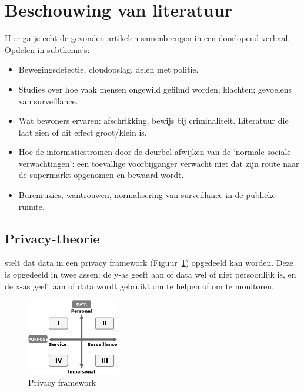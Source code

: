 \documentclass[nonacm, sigconf]{acmart}
\begin{document}
    \section{Beschouwing van literatuur}
    \begin{editorsonlyBox}
        Hier ga je echt de gevonden artikelen samenbrengen in een doorlopend verhaal.
        Opdelen in subthema's:

        \begin{itemize}
            \item Bewegingsdetectie, cloudopslag, delen met politie.
            \item Studies over hoe vaak mensen ongewild gefilmd worden; klachten; gevoelens van surveillance.
            \item Wat bewoners ervaren: afschrikking, bewijs bij criminaliteit. Literatuur die laat zien of dit effect groot/klein is.
            \item Hoe de informatiestromen door de deurbel afwijken van de ‘normale sociale verwachtingen': een toevallige voorbijganger verwacht niet dat zijn route naar de supermarkt opgenomen en bewaard wordt.
            \item Burenruzies, wantrouwen, normalisering van surveillance in de publieke ruimte.
        \end{itemize}

    \end{editorsonlyBox}

    \subsection{Privacy-theorie}\label{subsec:privacy-theorie}

    \parencite{van2016privacy} stelt dat data in een privacy framework (Figuur~\ref{fig:privacy_framework}) opgedeeld kan worden.
    Deze is opgedeeld in twee assen: de y-as geeft aan of data wel of niet persoonlijk is, en de x-as geeft aan of data wordt gebruikt om te helpen of om te monitoren.

    \begin{figure}[h]
        \centering
        \includegraphics[width=40mm]{images/SmartCityPrivacy}
        \caption{Privacy framework {}}
        \label{fig:privacy_framework}
    \end{figure}
\end{document}
